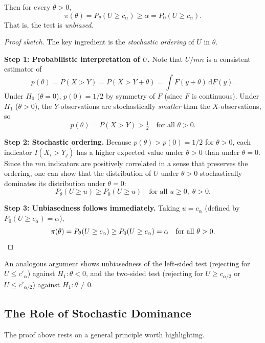 \documentclass[10pt]{article}
\begin{document}
Then for every $\theta > 0$,
\[
  \pi(\theta)
  = P_\theta(U \geq c_\alpha)
  \geq \alpha
  = P_0(U \geq c_\alpha).
\]
That is, the test is \emph{unbiased}.

\begin{proof}[Proof sketch]
The key ingredient is the \emph{stochastic ordering} of $U$ in
$\theta$.

\medskip
\noindent\textbf{Step 1: Probabilistic interpretation of $U$.}
Note that $U/mn$ is a consistent estimator of
\[
  p(\theta) = P(X > Y) = P(X > Y + \theta)
            = \int F(y + \theta)\,\mathrm{d}F(y).
\]
Under $H_0$ ($\theta = 0$), $p(0) = 1/2$ by symmetry of $F$ (since
$F$ is continuous). Under $H_1$ ($\theta > 0$), the $Y$-observations
are stochastically \emph{smaller} than the $X$-observations, so
\[
  p(\theta) = P(X > Y) > \tfrac{1}{2}
  \quad \text{for all } \theta > 0.
\]

\medskip
\noindent\textbf{Step 2: Stochastic ordering.}
Because $p(\theta) > p(0) = 1/2$ for $\theta > 0$, each
indicator $I(X_i > Y_j)$ has a higher expected value under
$\theta > 0$ than under $\theta = 0$. Since the $mn$ indicators are
positively correlated in a sense that preserves the ordering, one
can show that the distribution of $U$ under $\theta > 0$
stochastically dominates its distribution under $\theta = 0$:
\[
  P_\theta(U \geq u)
  \geq P_0(U \geq u)
  \quad \text{for all } u \geq 0, \; \theta > 0.
\]

\medskip
\noindent\textbf{Step 3: Unbiasedness follows immediately.}
Taking $u = c_\alpha$ (defined by $P_0(U \geq c_\alpha) = \alpha$),
\[
  \pi(\theta) = P_\theta(U \geq c_\alpha)
  \geq P_0(U \geq c_\alpha) = \alpha
  \quad \text{for all } \theta > 0. \qedhere
\]
\end{proof}

An analogous argument shows unbiasedness of the left-sided test
(rejecting for $U \leq c'_\alpha$) against $H_1 : \theta < 0$, and
the two-sided test (rejecting for $U \geq c_{\alpha/2}$ or
$U \leq c'_{\alpha/2}$) against $H_1 : \theta \neq 0$.

\subsection{The Role of Stochastic Dominance}

The proof above rests on a general principle worth highlighting.
\end{document}
